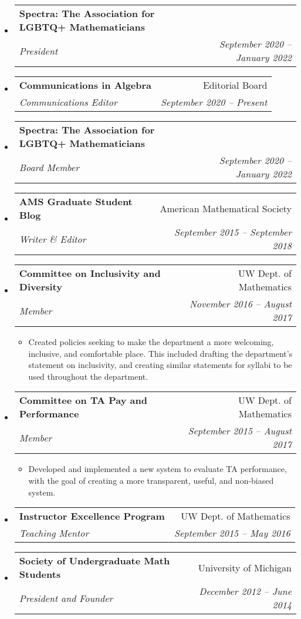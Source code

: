 \documentclass[letterpaper,11pt]{article}
\makeatletter
\newcommand{\resitem}[1]{\item #1 \vspace{-2pt}}
\newcommand{\ressubheading}[4]{
\begin{tabular*}{6.5in}[t]{l@{\cftdotfill{\cftsecdotsep}\extracolsep{\fill}}r}
		\textbf{#1} & #2 \\
		\textit{#3} & \textit{#4} \\
\end{tabular*}\vspace{-6pt}}
\makeatother
\begin{document}
\begin{itemize}
\item 
	\ressubheading{Spectra: The Association for LGBTQ+ Mathematicians }{}{President}{September 2020 -- January 2022}
	
\item 
	\ressubheading{Communications in Algebra }{Editorial Board}{Communications Editor}{September 2020 -- Present}
	
\item 
	\ressubheading{Spectra: The Association for LGBTQ+ Mathematicians }{}{Board Member}{September 2020 -- January 2022}
	
\item 
	\ressubheading{AMS Graduate Student Blog}{American Mathematical Society}{Writer \& Editor}{September 2015 -- September 2018}
	

\item 
	\ressubheading{Committee on Inclusivity and Diversity}{UW Dept. of Mathematics}{Member}{November 2016 -- August 2017}
	\begin{itemize}
		\resitem{Created policies seeking to make the department a more welcoming, inclusive, and comfortable place. This included drafting the department's statement on inclusivity, and creating similar statements for syllabi to be used throughout the department.}
	\end{itemize}

\item 
	\ressubheading{Committee on TA Pay and Performance}{UW Dept. of Mathematics}{Member}{September 2015 -- August 2017}
	\begin{itemize}
		\resitem{Developed and implemented a new system to evaluate TA performance, with the goal of creating a more transparent, useful, and non-biased system.}
	\end{itemize}
	
\item 
	\ressubheading{Instructor Excellence Program}{UW Dept. of Mathematics}{Teaching Mentor}{September 2015 -- May 2016}

\item 
	\ressubheading{Society of Undergraduate Math Students}{University of Michigan}{President and Founder}{December 2012 -- June 2014}

\end{itemize}
\end{document}
